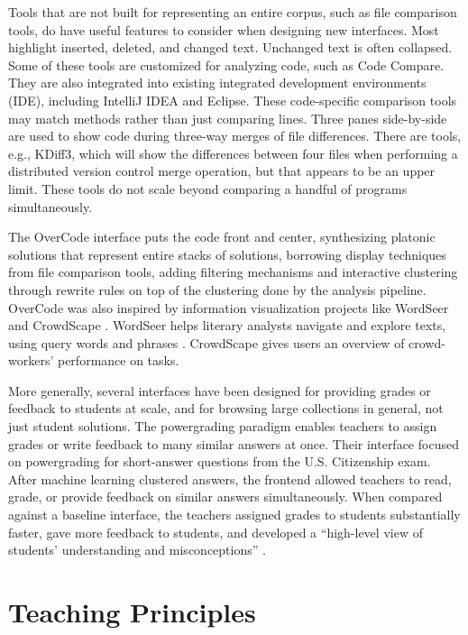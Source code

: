 Tools that are not built for representing an entire corpus, such as file comparison tools, do have useful features to consider when designing new interfaces. Most highlight inserted, deleted, and changed text. Unchanged text is often collapsed. Some of these tools are customized for analyzing code, such as Code Compare. They are also integrated into existing integrated development environments (IDE), including IntelliJ IDEA and Eclipse. These code-specific comparison tools may match methods rather than just comparing lines. Three panes side-by-side are used to show code during three-way merges of file differences. There are tools, e.g., KDiff3, which will show the differences between four files when performing a distributed version control merge operation, but that appears to be an upper limit. These tools do not scale beyond comparing a handful of programs simultaneously.

The OverCode interface puts the code front and center, synthesizing platonic solutions that represent entire stacks of solutions, borrowing display techniques from file comparison tools, adding filtering mechanisms and interactive clustering through rewrite rules on top of the clustering done by the analysis pipeline. OverCode was also inspired by information visualization projects like WordSeer \cite{wordseerlitcomp13,wordseercikm13} and CrowdScape \cite{crowdscape}. WordSeer helps literary analysts navigate and explore texts, using query words and phrases \cite{wordseerhcir11}. CrowdScape gives users an overview of crowd-workers' performance on tasks.

More generally, several interfaces have been designed for providing grades or feedback to students at scale, and for browsing large collections in general, not just student solutions. The powergrading paradigm \cite{basupowergrading} enables teachers to assign grades or write feedback to many similar answers at once. Their interface focused on powergrading for short-answer questions from the U.S. Citizenship exam. After machine learning clustered answers, the frontend allowed teachers to read, grade, or provide feedback on similar answers simultaneously. When compared against a baseline interface, the teachers assigned grades to students substantially faster, gave more feedback to students, and developed a ``high-level view of students' understanding and misconceptions'' \cite{basuDivideAndConquer}.

\section{Teaching Principles}


